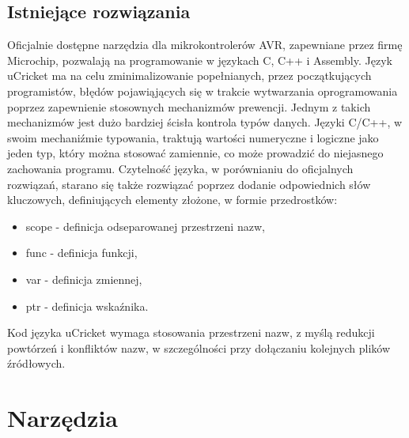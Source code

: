 \subsection{Istniejące rozwiązania}

Oficjalnie dostępne narzędzia dla mikrokontrolerów AVR, zapewniane przez firmę Microchip, pozwalają na programowanie w językach C, C++ i Assembly. Język uCricket ma na celu zminimalizowanie popełnianych, przez początkujących programistów, błędów pojawiąjących się w trakcie wytwarzania oprogramowania poprzez zapewnienie stosownych mechanizmów prewencji. Jednym z takich mechanizmów jest dużo bardziej ścisła kontrola typów danych. Języki C/C++, w swoim  mechaniźmie typowania, traktują wartości numeryczne i logiczne jako jeden typ, który można stosować zamiennie, co może prowadzić do niejasnego zachowania programu. 
Czytelność języka, w porównianiu do oficjalnych rozwiązań, starano się także rozwiązać poprzez dodanie odpowiednich słów kluczowych, definiujących elementy złożone, w formie przedrostków:
\begin{itemize}
\item scope - definicja odseparowanej przestrzeni nazw,
\item func - definicja funkcji,
\item var - definicja zmiennej,
\item ptr - definicja wskaźnika.
\end{itemize}
Kod języka uCricket wymaga stosowania przestrzeni nazw, z myślą redukcji powtórzeń i konfliktów nazw, w szczególności przy dołączaniu kolejnych plików źródłowych.


\section{Narzędzia}

